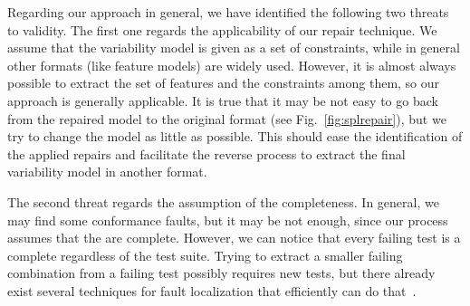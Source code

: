 \begin{tikzborder}{\cite{Gargantini16:validation}}
\begin{tikzborder}{\cite{gargantini_combinatorial_2017}}
\begin{tikzborder}{\cite{gargantini_combinatorial_2017}}
\begin{tikzborder}{\cite{garn2019}}
\begin{tikzborder}{\cite{arcaini2019achieving}}
\begin{tikzborder}{\cite{arcaini2019varivolution}}
		Regarding our approach in general, we have identified the following two threats to validity. The first one regards the applicability of our repair technique. We assume that the variability model is given as a set of constraints, while in general other formats (like feature models) are widely used. However, it is almost always possible to extract the set of features and the constraints among them, so our approach is generally applicable. It is true that it may be not easy to go back from the repaired model to the original format (see Fig.~\ref{fig:splrepair}), but we try to change the model as little as possible. This should ease the identification of the applied repairs and facilitate the reverse process to extract the final variability model in another format.
		
		The second threat regards the assumption of the \fccs completeness. In general, we may find some conformance faults, but it may be not enough, since our process assumes that the \fccs are complete. However, we can notice that every failing test is a complete \fcc regardless of the test suite. Trying to extract a smaller failing combination from a failing test possibly requires new tests, but there already exist several techniques for fault localization that efficiently can do that~\cite{ben_2015}.	
		\be
		

\end{tikzborder}
\end{tikzborder}
\end{tikzborder}
\end{tikzborder}
\end{tikzborder}
\end{tikzborder}
